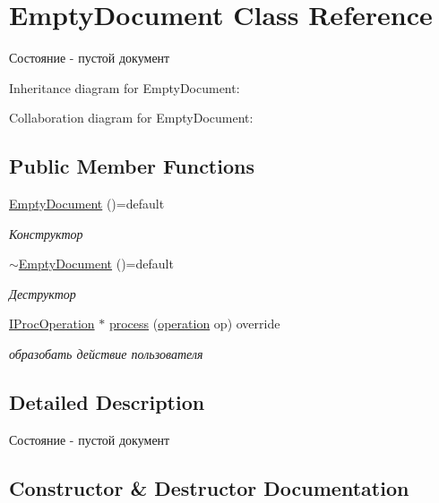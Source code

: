 \hypertarget{class_empty_document}{}\section{Empty\+Document Class Reference}
\label{class_empty_document}


Состояние -\/ пустой документ  




Inheritance diagram for Empty\+Document\+:


Collaboration diagram for Empty\+Document\+:
\subsection*{Public Member Functions}
\begin{DoxyCompactItemize}
\item 
\hyperlink{class_empty_document_a2f664af6dd00e55364194c337bec1a7f}{Empty\+Document} ()=default
\begin{DoxyCompactList}\small\item\em Конструктор \end{DoxyCompactList}\item 
\hyperlink{class_empty_document_a4338032c6f5f362158f0abb85ad7b54b}{$\sim$\+Empty\+Document} ()=default
\begin{DoxyCompactList}\small\item\em Деструктор \end{DoxyCompactList}\item 
\hyperlink{struct_i_proc_operation}{I\+Proc\+Operation} $\ast$ \hyperlink{class_empty_document_a267049c95f55bacd79998a438a5b01d4}{process} (\hyperlink{main_8cpp_ad34e7fb3c33543e9f3a1e48486fa7692}{operation} op) override
\begin{DoxyCompactList}\small\item\em образобать действие пользователя \end{DoxyCompactList}\end{DoxyCompactItemize}


\subsection{Detailed Description}
Состояние -\/ пустой документ 

\subsection{Constructor \& Destructor Documentation}
